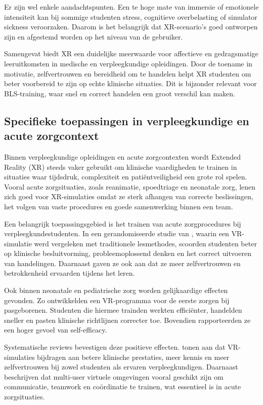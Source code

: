 Er zijn wel enkele aandachtspunten. Een te hoge mate van immersie of emotionele intensiteit kan bij sommige studenten stress, cognitieve overbelasting of simulator sickness veroorzaken. Daarom is het belangrijk dat XR-scenario’s goed ontworpen zijn en afgestemd worden op het niveau van de gebruiker.

Samengevat biedt XR een duidelijke meerwaarde voor affectieve en gedragsmatige leeruitkomsten in medische en verpleegkundige opleidingen. Door de toename in motivatie, zelfvertrouwen en bereidheid om te handelen helpt XR studenten om beter voorbereid te zijn op echte klinische situaties. Dit is bijzonder relevant voor BLS-training, waar snel en correct handelen een groot verschil kan maken.

\subsection{Specifieke toepassingen in verpleegkundige en acute zorgcontext}

Binnen verpleegkundige opleidingen en acute zorgcontexten wordt Extended Reality (XR) steeds vaker gebruikt om klinische vaardigheden te trainen in situaties waar tijdsdruk, complexiteit en patiëntveiligheid een grote rol spelen. Vooral acute zorgsituaties, zoals reanimatie, spoedtriage en neonatale zorg, lenen zich goed voor XR-simulaties omdat ze sterk afhangen van correcte beslissingen, het volgen van vaste procedures en goede samenwerking binnen een team.

Een belangrijk toepassingsgebied is het trainen van acute zorgprocedures bij verpleegkundestudenten. In een gerandomiseerde studie van \textcite{Padilha2019VR}, waarin een VR-simulatie werd vergeleken met traditionele lesmethodes, scoorden studenten beter op klinische besluitvorming, probleemoplossend denken en het correct uitvoeren van handelingen. Daarnaast gaven ze ook aan dat ze meer zelfvertrouwen en betrokkenheid ervaarden tijdens het leren.

Ook binnen neonatale en pediatrische zorg worden gelijkaardige effecten gevonden. Zo ontwikkelden \textcite{Hung2024VR} een VR-programma voor de eerste zorgen bij pasgeborenen. Studenten die hiermee trainden werkten efficiënter, handelden sneller en pasten klinische richtlijnen correcter toe. Bovendien rapporteerden ze een hoger gevoel van self-efficacy.

Systematische reviews bevestigen deze positieve effecten. \textcite{ShoreyNg2021VRSR} tonen aan dat VR-simulaties bijdragen aan betere klinische prestaties, meer kennis en meer zelfvertrouwen bij zowel studenten als ervaren verpleegkundigen. Daarnaast beschrijven \textcite{Liaw2018MUVW} dat multi-user virtuele omgevingen vooral geschikt zijn om communicatie, teamwork en coördinatie te trainen, wat essentieel is in acute zorgsituaties.

